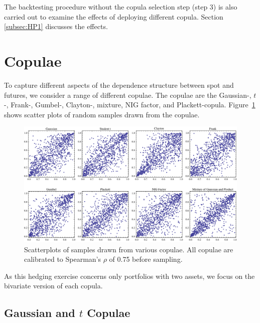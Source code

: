 \documentclass[11pt,a4paper,english]{article}
\begin{document}
The backtesting procedure without the copula selection step (step 3) is also carried out to examine the effects of deploying different copula. 
Section \ref{subsec:HP1} discusses the effects. 

\section{Copulae}\label{sec:crm}
To capture different aspects of the dependence structure between spot and futures, we consider
a range of different copulae. 
The copulae are the Gaussian-, $t$-, Frank-,
Gumbel-, Clayton-, mixture, NIG factor, and Plackett-copula. 
Figure~\ref{fig:copulaeScatterPlot} shows scatter plots of random
samples drawn from the copulae. 
\begin{figure}[t]
    \centering
  \includegraphics[width=\textwidth]{_pics/copulas_scatterplots.pdf}
  \caption{Scatterplots of samples drawn from various copulae. All
    copulae are calibrated to Spearman's $\rho$ of 0.75 before
    sampling.}\label{fig:copulaeScatterPlot} 
\end{figure}

As this hedging exercise concerns only portfolios with two assets, we
focus on the bivariate version of each copula. 

\subsection{Gaussian and $t$ Copulae}\label{sec:ellpitical-copulae}
\end{document}
